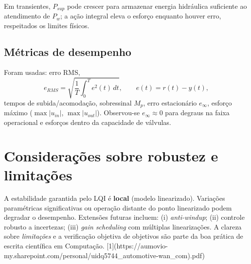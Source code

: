 Em transientes, $P_{sup}$ pode crescer para armazenar energia hidráulica suficiente ao atendimento de $P_w$; a ação integral eleva o esforço enquanto houver erro, respeitados os limites físicos.

\subsection{Métricas de desempenho}
\label{sec:avaliacao-quantitativa-desempenho}

Foram usadas: erro RMS,
\[
e_{RMS}=\sqrt{\frac{1}{T}\int_0^T e^2(t)\,dt},\qquad e(t)=r(t)-y(t),
\]
tempos de subida/acomodação, sobressinal $M_p$, erro estacionário $e_\infty$, esforço máximo ($\max|u_{in}|$, $\max|u_{out}|$). Observou-se $e_\infty\!\approx\!0$ para degraus na faixa operacional e esforços dentro da capacidade de válvulas.

\section{Considerações sobre robustez e limitações}
\label{sec:consideracoes-robustez-limitacoes}

A estabilidade garantida pelo LQI é \textbf{local} (modelo linearizado). Variações paramétricas significativas ou operação distante do ponto linearizado podem degradar o desempenho. Extensões futuras incluem: (i) \emph{anti-windup}; (ii) controle robusto a incertezas; (iii) \emph{gain scheduling} com múltiplas linearizações. A clareza sobre \emph{limitações} e a verificação objetiva de objetivos são parte da boa prática de escrita científica em Computação. [1](https://aumovio-my.sharepoint.com/personal/uidq5744_automotive-wan_com).pdf)
